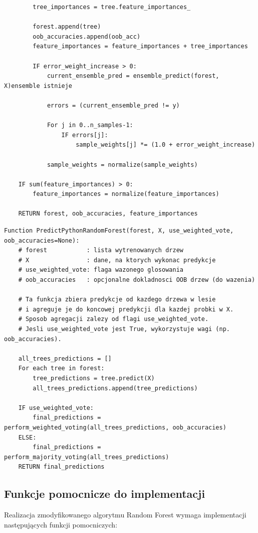 \documentclass[11pt,a4paper]{article}
\begin{document}
\begin{lstlisting}
        tree_importances = tree.feature_importances_

        forest.append(tree)
        oob_accuracies.append(oob_acc)
        feature_importances = feature_importances + tree_importances

        IF error_weight_increase > 0:
            current_ensemble_pred = ensemble_predict(forest, X)ensemble istnieje

            errors = (current_ensemble_pred != y)

            For j in 0..n_samples-1:
                IF errors[j]:
                    sample_weights[j] *= (1.0 + error_weight_increase)

            sample_weights = normalize(sample_weights)

    IF sum(feature_importances) > 0:
        feature_importances = normalize(feature_importances)

    RETURN forest, oob_accuracies, feature_importances
\end{lstlisting}

\begin{lstlisting}Function PredictPythonRandomForest(forest, X, use_weighted_vote, oob_accuracies=None):
    # forest           : lista wytrenowanych drzew
    # X                : dane, na ktorych wykonac predykcje
    # use_weighted_vote: flaga wazonego glosowania
    # oob_accuracies   : opcjonalne dokladnosci OOB drzew (do wazenia)

    # Ta funkcja zbiera predykcje od kazdego drzewa w lesie
    # i agreguje je do koncowej predykcji dla kazdej probki w X.
    # Sposob agregacji zalezy od flagi use_weighted_vote.
    # Jesli use_weighted_vote jest True, wykorzystuje wagi (np. oob_accuracies).

    all_trees_predictions = []
    For each tree in forest:
        tree_predictions = tree.predict(X)
        all_trees_predictions.append(tree_predictions)

    IF use_weighted_vote:
        final_predictions = perform_weighted_voting(all_trees_predictions, oob_accuracies)
    ELSE:
        final_predictions = perform_majority_voting(all_trees_predictions)
    RETURN final_predictions
\end{lstlisting}


\subsection{Funkcje pomocnicze do implementacji}

Realizacja zmodyfikowanego algorytmu Random Forest wymaga implementacji następujących funkcji pomocniczych:
\end{document}
